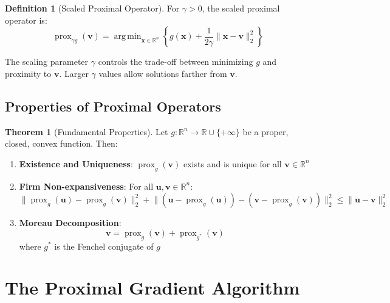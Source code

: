 \documentclass[12pt]{article}
\renewcommand{\vec}[1]{\mathbf{#1}}
\DeclareMathOperator{\argmin}{arg\,min}
\DeclareMathOperator{\prox}{prox}
\newcommand{\norm}[1]{\lVert #1 \rVert}
\newcommand{\R}{\mathbb{R}}
\theoremstyle{definition}
\newtheorem{definition}{Definition}[section]
\newtheorem{theorem}{Theorem}[section]
\begin{document}
\begin{definition}[Scaled Proximal Operator]
    For $\gamma > 0$, the scaled proximal operator is:
    \begin{equation}
        \prox_{\gamma g}(\vec{v}) = \argmin_{\vec{x} \in \R^n} \left\{ g(\vec{x}) + \frac{1}{2\gamma}\norm{\vec{x} - \vec{v}}_2^2 \right\}
    \end{equation}
\end{definition}

The scaling parameter $\gamma$ controls the trade-off between minimizing $g$ and proximity to $\vec{v}$. Larger $\gamma$ values allow solutions farther from $\vec{v}$.

\subsection{Properties of Proximal Operators}

\begin{theorem}[Fundamental Properties]
    Let $g: \R^n \to \R \cup \{+\infty\}$ be a proper, closed, convex function. Then:
    \begin{enumerate}
        \item \textbf{Existence and Uniqueness}: $\prox_g(\vec{v})$ exists and is unique for all $\vec{v} \in \R^n$
        \item \textbf{Firm Non-expansiveness}: For all $\vec{u}, \vec{v} \in \R^n$:
              \begin{equation}
                  \norm{\prox_g(\vec{u}) - \prox_g(\vec{v})}_2^2 + \norm{(\vec{u} - \prox_g(\vec{u})) - (\vec{v} - \prox_g(\vec{v}))}_2^2 \leq \norm{\vec{u} - \vec{v}}_2^2
              \end{equation}
        \item \textbf{Moreau Decomposition}:
              \begin{equation}
                  \vec{v} = \prox_g(\vec{v}) + \prox_{g^*}(\vec{v})
              \end{equation}
              where $g^*$ is the Fenchel conjugate of $g$
    \end{enumerate}
\end{theorem}

\newpage
\section{The Proximal Gradient Algorithm}
\end{document}
